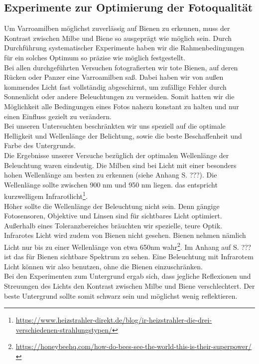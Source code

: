 \documentclass[11pt,a4paper]{article}
\begin{document}
\subsection{Experimente zur Optimierung der Fotoqualität}
Um Varroamilben möglichst zuverlässig auf Bienen zu erkennen, muss der Kontrast zwischen Milbe und Biene so ausgeprägt wie möglich sein. Durch Durchführung systematischer Experimente haben wir die Rahmenbedingungen für ein solches Optimum so präzise wie möglich festgestellt.\\
Bei allen durchgeführten Versuchen fotografierten wir tote Bienen, auf deren Rücken oder Panzer eine Varroamilben saß. Dabei haben wir von außen kommendes Licht fast vollständig abgeschirmt, um zufällige Fehler durch Sonnenlicht oder andere Beleuchtungen zu vermeiden. Somit hatten wir die Möglichkeit alle Bedingungen eines Fotos nahezu konstant zu halten und nur einen Einfluss gezielt zu verändern.\\
Bei unseren Untersuchten beschränkten wir uns speziell auf die optimale Helligkeit und Wellenlänge der Belichtung, sowie die beste Beschaffenheit und Farbe des Untergrunds.\\
Die Ergebnisse unserer Versuche bezüglich der optimalen Wellenlänge der Beleuchtung waren eindeutig. Die Milben sind bei Licht mit einer besonders hohen Wellenlänge am besten zu erkennen (siehe Anhang S. ???). Die Wellenlänge sollte zwischen 900 nm und 950 nm liegen. das entspricht kurzwelligem Infrarotlicht\footnote{\url{https://www.heizstrahler-direkt.de/blog/ir-heizstrahler-die-drei-verschiedenen-strahlungstypen/}}.\\
Höher sollte die Wellenlänge der Beleuchtung nicht sein. Denn gängige Fotosensoren, Objektive und Linsen sind für sichtbares Licht optimiert. Außerhalb eines Toleranzbereiches bräuchten wir spezielle, teure Optik.\\
Infrarotes Licht wird zudem von Bienen nicht gesehen. Bienen nehmen nämlich Licht nur bis zu einer Wellenlänge von etwa 650nm wahr\footnote{\url{https://honeybeehq.com/how-do-bees-see-the-world-this-is-their-superpower/}}. Im Anhang auf S. ??? ist das für Bienen sichtbare Spektrum zu sehen. Eine Beleuchtung mit Infrarotem Licht können wir also benutzen, ohne die Bienen einzuschränken.\\
Bei den Experimenten zum Untergrund ergab sich, dass jegliche Reflexionen und Streuungen des Lichts den Kontrast zwischen Milbe und Biene verschlechtert. Der beste Untergrund sollte somit schwarz sein und möglichst wenig reflektieren.
\end{document}

